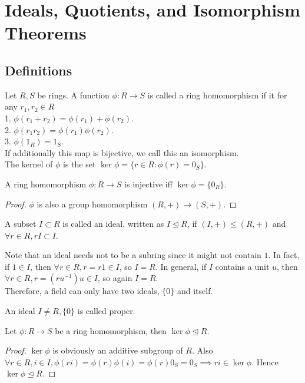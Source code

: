 \section{Ideals, Quotients, and Isomorphism Theorems}
\subsection{Definitions}
\begin{definition}
    Let $R,S$ be rings.
    A function $\phi:R\to S$ is called a ring homomorphism if it for any $r_1,r_2\in R$\\
    1. $\phi(r_1+r_2)=\phi(r_1)+\phi(r_2)$.\\
    2. $\phi(r_1r_2)=\phi(r_1)\phi(r_2)$.\\
    3. $\phi(1_R)=1_S$.\\
    If additionally this map is bijective, we call this an isomorphism.\\
    The kernel of $\phi$ is the set $\ker\phi=\{r\in R:\phi(r)=0_S\}$.
\end{definition}
\begin{lemma}
    A ring homomorphism $\phi:R\to S$ is injective iff $\ker\phi=\{0_R\}$. 
\end{lemma}
\begin{proof}
    $\phi$ is also a group homomorphism $(R,+)\to (S,+)$.
\end{proof}
\begin{definition}
    A subset $I\subset R$ is called an ideal, written as $I\unlhd R$, if $(I,+)\le (R,+)$ and $\forall r\in R,rI\subset I$.
\end{definition}
\begin{remark}
    Note that an ideal needs not to be a subring since it might not contain $1$.
    In fact, if $1\in I$, then $\forall r\in R, r=r1\in I$, so $I=R$.
    In general, if $I$ contains a unit $u$, then $\forall r\in R,r=(ru^{-1})u\in I$, so again $I=R$.\\
    Therefore, a field can only have two ideals, $\{0\}$ and itself.
\end{remark}
An ideal $I\neq R,\{0\}$ is called proper.
\begin{lemma}
    Let $\phi:R\to S$ be a ring homomorphism, then $\ker\phi\unlhd R$.
\end{lemma}
\begin{proof}
    $\ker\phi$ is obviously an additive subgroup of $R$.
    Also $\forall r\in R,i\in I,\phi(ri)=\phi(r)\phi(i)=\phi(r)0_S=0_S\implies ri\in\ker\phi$.
    Hence $\ker\phi\unlhd R$.
\end{proof}
